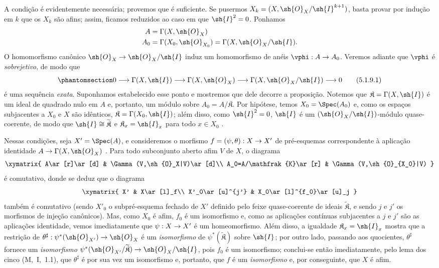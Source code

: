 \documentclass[oneside]{amsart}
\makeatletter
\newcommand{\ega@arrow}[2]{\mathchoice{#1}{#2}{#2}{#2}}
\renewcommand{\to}{\ega@arrow{\longrightarrow}{\rightarrow}}
\let\EGAOriginalLabel\label
\renewcommand{\label}[1]{\phantomsection\EGAOriginalLabel{#1}}
\makeatother
\begin{document}
A condição é evidentemente necessária; provemos que é suficiente.
Se pusermos $X_k=(X,\sh{O}_X/\sh{I}^{k+1})$, basta provar por indução em $k$ que os $X_k$ são afins; assim, ficamos reduzidos ao caso em que $\sh{I}^2=0$.
Ponhamos
\begin{align*}
  A&=\Gamma(X,\sh{O}_X)\\
  A_0&=\Gamma(X_0,\sh{O}_{X_0})=\Gamma(X,\sh{O}_X/\sh{I}).
\end{align*}
O homomorfismo canônico $\sh{O}_X\to\sh{O}_X/\sh{I}$ induz um homomorfismo de anéis $\vphi:A\to A_0$.
Veremos adiante que $\vphi$ é \emph{sobrejetivo}, de modo que
\[
\label{I.5.1.9.1}
  0\to\Gamma(X,\sh{I})\to\Gamma(X,\sh{O}_X)\to\Gamma(X,\sh{O}_X/\sh{I})\to 0\tag{5.1.9.1}
\]
é uma sequência \emph{exata}.
Suponhamos estabelecido esse ponto e mostremos que dele decorre a proposição.
Notemos que $\mathfrak{K}=\Gamma(X,\sh{I})$ é um ideal de quadrado nulo em $A$ e, portanto, um módulo sobre $A_0=A/\mathfrak{K}$.
Por hipótese, temos $X_0=\Spec(A_0)$ e, como os espaços subjacentes a $X_0$ e $X$ são idênticos, $\mathfrak{K}=\Gamma(X_0,\sh{I})$;
além disso, como $\sh{I}^2=0$, $\sh{I}$ é um $(\sh{O}_X/\sh{I})$-módulo quase-coerente, de modo que $\sh{I}\cong\widetilde{\mathfrak{K}}$ e $\mathfrak{K}_x=\sh{I}_x$ para todo $x\in X_0$ .

Nessas condições, seja $X'=\Spec(A)$, e consideremos o morfismo $f=(\psi,\theta):X\to X'$ de pré-esquemas correspondente à aplicação identidade $A\to\Gamma(X,\sh{O}_X)$ .
Para todo subconjunto aberto afim $V$ de $X$, o diagrama
\[
  \xymatrix{
    A\ar[r]\ar[d] &
    \Gamma(V,\sh{O}_X|V)\ar[d]\\
    A_0=A/\mathfrak{K}\ar[r] &
    \Gamma(V,\sh{O}_{X_0}|V)
  }
\]
é comutativo, donde se deduz que o diagrama
\[
  \xymatrix{
    X' &
    X\ar[l]_f\\
    X'_0\ar[u]^{j'} &
    X_0\ar[l]^{f_0}\ar[u]_j
  }
\]
também é comutativo (sendo $X'_0$ o subpré-esquema fechado de $X'$ definido pelo feixe quase-coerente de ideais $\widetilde{\mathfrak{K}}$, e sendo $j$ e $j'$ os morfismos de injeção canônicos).
Mas, como $X_0$ é afim, $f_0$ é um isomorfismo e, como as aplicações contínuas subjacentes a $j$ e $j'$ são as aplicações identidade, vemos imediatamente que $\psi:X\to X'$ é um homeomorfismo.
Além disso, a igualdade $\mathfrak{K}_x=\sh{I}_x$ mostra que a restrição de $\theta^\sharp:\psi^*(\sh{O}_{X'})\to\sh{O}_X$ é um \emph{isomorfismo} de $\psi^*(\widetilde{\mathfrak{K}})$ sobre $\sh{I}$;
por outro lado, passando aos quocientes, $\theta^\sharp$ fornece um \emph{isomorfismo} $\psi^*(\sh{O}_{X'}/\widetilde{\mathfrak{K}})\to\sh{O}_X/\sh{I}$, pois $f_0$ é um isomorfismo;
conclui-se então imediatamente, pelo lema dos cinco (M,~I,~1.1), que $\theta^\sharp$ é por sua vez um isomorfismo e, portanto, que $f$ é um \emph{isomorfismo} e, por conseguinte, que $X$ é afim.
\end{document}
